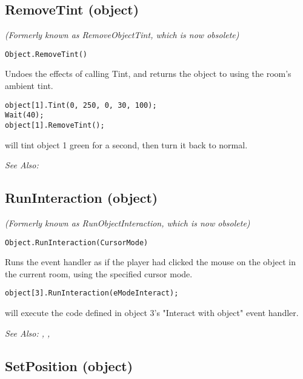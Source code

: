 \subsection{RemoveTint (object)}\label{Object.RemoveTint}%

\it{(Formerly known as RemoveObjectTint, which is now obsolete)}

\begin{verbatim}
Object.RemoveTint()
\end{verbatim}

Undoes the effects of calling Tint, and returns the object to using the room's ambient tint.

\begin{verbatim}
object[1].Tint(0, 250, 0, 30, 100);
Wait(40);
object[1].RemoveTint();
\end{verbatim}
will tint object 1 green for a second, then turn it back to normal.

\it{See Also:} 


\subsection{RunInteraction (object)}\label{Object.RunInteraction}%

\it{(Formerly known as RunObjectInteraction, which is now obsolete)}

\begin{verbatim}
Object.RunInteraction(CursorMode)
\end{verbatim}
Runs the event handler as if the player had clicked the mouse
on the object in the current room, using the specified cursor mode.

\begin{verbatim}
object[3].RunInteraction(eModeInteract);
\end{verbatim}
will execute the code defined in object 3's "Interact with object" event handler.

\it{See Also:} ,
,


\subsection{SetPosition (object)}\label{Object.SetPosition}%

